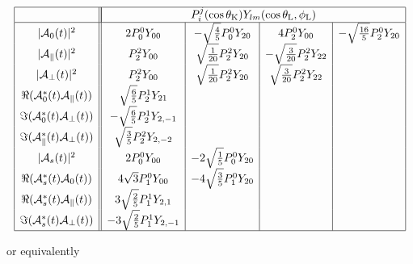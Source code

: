 \documentclass[a4paper,10pt,twosided]{article}
\def\thetaK{\theta_\mathrm{K}}
\def\thetaL{\theta_\mathrm{L}}
\def\phiL{\phi_\mathrm{L}}
\begin{document}
\begin{equation}
\begin{array}{|c|| c | c | c | c | }
 \hline
&\multicolumn{4}{|c|}{ P_i^j(\cos\thetaK)Y_{lm}(\cos\thetaL,\phiL) } \\
 \hline
|{\cal A}_0(t)|^2                       & 2P_0^0Y_{00} & -\sqrt{\frac{4}{5}}P_0^0Y_{20} & 4P_2^0Y_{00} & -\sqrt{\frac{16}{5}} P_2^0Y_{20}  \\
|{\cal A}_\parallel(t)|^2               & P_2^2Y_{00} &\sqrt{\frac{1}{20}} P_2^2Y_{20} &-\sqrt{\frac{3}{20}}P_2^2Y_{22} & \\
|{\cal A}_\perp(t)|^2                   & P_2^2Y_{00} & \sqrt{\frac{1}{20}} P_2^2Y_{20} &\sqrt{\frac{3}{20}}P_2^2Y_{22} & \\
\Re({\cal A}_0^*(t){\cal A}_\parallel(t))     & \sqrt{\frac{6}{5}}P_2^1Y_{21}&&&\\
\Im({\cal A}_0^*(t){\cal A}_\perp(t))         & -\sqrt{\frac{6}{5}}P_2^1Y_{2,-1}&&&\\
\Im({\cal A}_\parallel^*(t){\cal A}_\perp(t)) & \sqrt{\frac{3}{5}}P_2^2Y_{2,-2}&&&\\
|{\cal A}_{s}(t)|^2                   &  2 P_0^0 Y_{00} & -2 \sqrt{\frac{1}{5}} P_0^0 Y_{20} && \\
\Re({\cal A}_{s}^*(t){\cal A}_0(t))   &  4 \sqrt{3} P_1^0 Y_{00} & -4 \sqrt{\frac{3}{5}} P_1^0 Y_{20} && \\
\Re({\cal A}_{s}^*(t){\cal A}_\parallel(t))   &  3\sqrt{\frac{2}{5}} P_1^1 Y_{2,1} &&& \\
\Im({\cal A}_{s}^*(t){\cal A}_\perp(t))     &  -3\sqrt{\frac{2}{5}} P_1^1 Y_{2,-1} &&& \\
 \hline
\end{array}
\end{equation}

or equivalently
\end{document}
